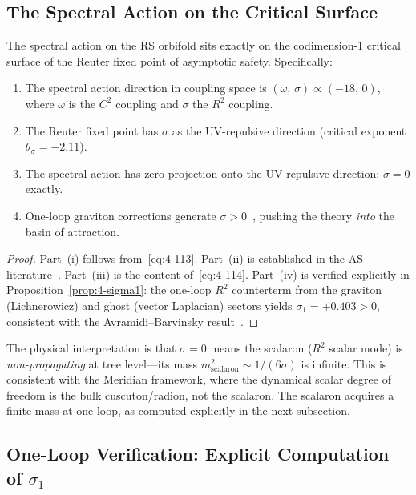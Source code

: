 \subsection{The Spectral Action on the Critical Surface}
\label{sec:4-critical-surface}

\begin{theorem}\label{thm:4-critical}
The spectral action on the RS orbifold sits exactly on the codimension-1 critical surface of the Reuter fixed point of asymptotic safety. Specifically:
\begin{enumerate}
  \item[(i)] The spectral action direction in coupling space is $(\omega,\, \sigma) \propto (-18,\, 0)$, where $\omega$ is the $C^2$ coupling and $\sigma$ the $R^2$ coupling.
  \item[(ii)] The Reuter fixed point has $\sigma$ as the UV-repulsive direction (critical exponent $\theta_\sigma = -2.11$).
  \item[(iii)] The spectral action has zero projection onto the UV-repulsive direction: $\sigma = 0$ exactly.
  \item[(iv)] One-loop graviton corrections generate $\sigma > 0$~\cite{ch4:AvramidiBarvinsky1985,ch4:FradkinTseytlin1982}, pushing the theory \emph{into} the basin of attraction.
\end{enumerate}
\end{theorem}

\begin{proof}
Part~(i) follows from~\eqref{eq:4-113}. Part~(ii) is established in the AS literature~\cite{ch4:Benedetti2010,ch4:Codello2009}. Part~(iii) is the content of~\eqref{eq:4-114}. Part~(iv) is verified explicitly in Proposition~\ref{prop:4-sigma1}: the one-loop $R^2$ counterterm from the graviton (Lichnerowicz) and ghost (vector Laplacian) sectors yields $\sigma_1 = +0.403 > 0$, consistent with the Avramidi--Barvinsky result~\cite{ch4:AvramidiBarvinsky1985}.
\end{proof}

The physical interpretation is that $\sigma = 0$ means the scalaron ($R^2$ scalar mode) is \emph{non-propagating} at tree level---its mass $m_{\mathrm{scalaron}}^2 \sim 1/(6\sigma)$ is infinite. This is consistent with the Meridian framework, where the dynamical scalar degree of freedom is the bulk cuscuton/radion, not the scalaron. The scalaron acquires a finite mass at one loop, as computed explicitly in the next subsection.

\subsection{One-Loop Verification: Explicit Computation of \texorpdfstring{$\sigma_1$}{sigma1}}
\label{sec:4-oneloop-r2}

